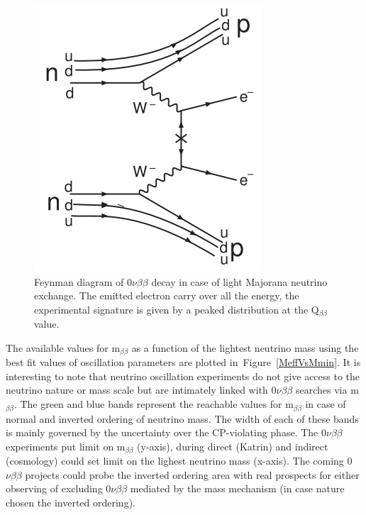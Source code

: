 \documentclass[main.tex]{subfiles}
\begin{document}
\begin{figure}[h!]
\begin{center}
\includegraphics[scale=0.50]{pictures/Chap2/0nubbFeynmanMassMechanism.png}
\caption{Feynman diagram of 0$\nu\beta\beta$ decay in case of light Majorana neutrino exchange. The emitted electron carry over all the energy, the experimental signature is given by a peaked distribution at the Q$_{\beta\beta}$ value.}
\label{0nubbFeynmanMassMechanism}
\end{center}
\end{figure}


\NI The available values for m$_{\beta\beta}$ as a function of the lightest neutrino mass using the best fit values of oscillation parameters are plotted in~Figure~\ref{MeffVsMmin}. It is interesting to note that neutrino oscillation experiments do not give access to the neutrino nature or mass scale but are intimately linked with 0$\nu\beta\beta$ searches via m$_{\beta\beta}$. The green and blue bands represent the reachable values for m$_{\beta\beta}$ in case of normal and inverted ordering of neutrino mass. The width of each of these bands is mainly governed by the uncertainty over the CP-violating phase. The 0$\nu\beta\beta$ experiments put limit on m$_{\beta\beta}$ (y-axis), during direct (Katrin) and indirect (cosmology) could set limit on the lighest neutrino mass (x-axis). The coming 0$\nu\beta\beta$ projects could probe the inverted ordering area with real prospects for either observing of excluding 0$\nu\beta\beta$ mediated by the mass mechanism (in case nature chosen the inverted ordering).
\end{document}
